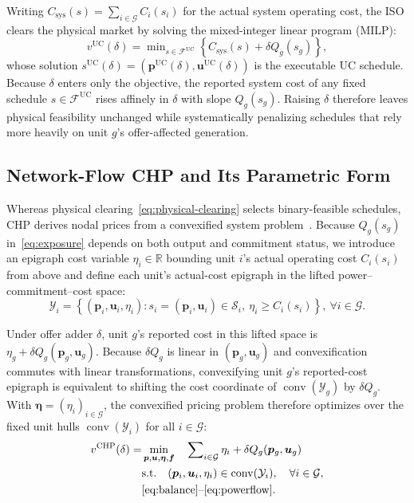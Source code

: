 \documentclass[journal]{IEEEtran}
\DeclareMathOperator{\conv}{conv}
\newcommand{\R}{\mathbb R}
\newcommand{\bp}{\bm p}
\newcommand{\bu}{\bm u}
\newcommand{\UC}{\mathrm{UC}}
\newcommand{\CHP}{\mathrm{CHP}}
\begin{document}
Writing $C_{\mathrm{sys}}(s)=\sum\nolimits_{i\in\mathcal{G}}C_i(s_i)$ for the actual system operating cost, the ISO clears the physical market by solving the mixed-integer linear program (MILP):
\begin{equation}
v^{\UC}(\delta) = \min\nolimits_{s\in\mathcal{F}^{\UC}}
\left\{ C_{\mathrm{sys}}(s) + \delta Q_g(s_g) \right\},\label{eq:physical-clearing}
\end{equation}
whose solution $s^{\UC}(\delta)=(\bp^{\UC}(\delta),\bu^{\UC}(\delta))$ is the executable UC schedule. Because $\delta$ enters only the objective, the reported system cost of any fixed schedule $s\in\mathcal{F}^{\UC}$ rises affinely in $\delta$ with slope $Q_g(s_g)$. Raising $\delta$ therefore leaves physical feasibility unchanged while systematically penalizing schedules that rely more heavily on unit $g$'s offer-affected generation.

\subsection{Network-Flow CHP and Its Parametric Form}
\label{subsec:dag-model}
Whereas physical clearing~\eqref{eq:physical-clearing} selects binary-feasible schedules, CHP derives nodal prices from a convexified system problem~\cite{gribik2007,hua2017}. Because $Q_g(s_g)$ in~\eqref{eq:exposure} depends on both output and commitment status, we introduce an epigraph cost variable $\eta_i\!\!\in\!\!\R$ bounding unit $i$'s actual operating cost $C_i(s_i)$ from above and define each unit's actual-cost epigraph in the lifted power--commitment--cost space:
\begin{equation}
\mathcal{Y}_i \!\!=\!\! \left\{ (\bp_i,\bu_i,\eta_i) \!\!:\!\! s_i\!\!=\!\!(\bp_i,\bu_i)\!\!\in\!\!\mathcal{S}_i,\ \eta_i\!\!\ge\!\! C_i(s_i) \right\}, \ \forall i\in\mathcal{G}.\label{eq:unit-hull}
\end{equation}

Under offer adder $\delta$, unit $g$'s reported cost in this lifted space is $\eta_g + \delta Q_g(\bp_g,\bu_g)$. Because $\delta Q_g$ is linear in $(\bp_g,\bu_g)$ and convexification commutes with linear transformations, convexifying unit $g$'s reported-cost epigraph is equivalent to shifting the cost coordinate of $\conv(\mathcal{Y}_g)$ by $\delta Q_g$. With $\bm\eta=(\eta_i)_{i\in\mathcal{G}}$, the convexified pricing problem therefore optimizes over the fixed unit hulls $\conv(\mathcal{Y}_i)$ for all $i\in\mathcal{G}$:
\begin{subequations}\label{eq:hull-clearing}
\begin{align}
v^{\CHP}(\delta) = &\min_{\bp,\bu,\bm\eta,\bm f}\quad \sum\nolimits_{i\in\mathcal{G}}\eta_i + \delta Q_g(\bp_g,\bu_g)\\
&\mathrm{s.t.}\quad (\bp_i,\bu_i,\eta_i)\in\conv(\mathcal{Y}_i), \quad \forall i\in\mathcal{G},\\
& \eqref{eq:balance}\text{--}\eqref{eq:powerflow}.\notag
\end{align}
\end{subequations}
\end{document}
